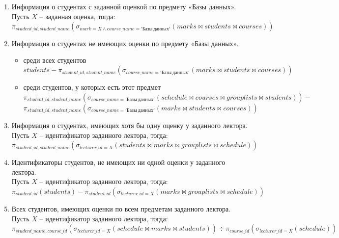 \documentclass[10pt, a4paper]{article}
\begin{document}
\begin{enumerate}

	\item {Информация о студентах с заданной оценкой по предмету «Базы данных».\\
	Пусть $X$ -- заданная оценка, тогда:\\
	$\pi_{student\_id, student\_name}(\sigma_{mark = X \wedge course\_name = 'Базы \: данных'}(marks \bowtie students \bowtie courses))$
	}


	\item {Информация о студентах не имеющих оценки по предмету «Базы данных».
		\begin{itemize}

			\item {среди всех студентов\\
			$students - \pi_{student\_id, student\_name}(\sigma_{course\_name = 'Базы \: данных'}(marks \bowtie students \bowtie courses))$
			}

			\item {среди студентов, у которых есть этот предмет\\
			$\pi_{student\_id, student\_name}(\sigma_{course\_name = 'Базы \: данных'}(schedule \bowtie courses \bowtie grouplists \bowtie students)) -$\\
			$\pi_{student\_id, student\_name}(\sigma_{course\_name = 'Базы \: данных'}(marks \bowtie students \bowtie courses))$
			}

		\end{itemize}
	}

	\item {Информация о студентах, имеющих хотя бы одну оценку у заданного лектора.\\
	Пусть $X$ -- идентификатор заданного лектора, тогда:\\
	$\pi_{student\_id, student\_name}(\sigma_{lecturer\_id = X}(students \bowtie marks \bowtie grouplists \bowtie schedule))$
	}

	\item {Идентификаторы студентов, не имеющих ни одной оценки у заданного лектора.\\
	Пусть $X$ -- идентификатор заданного лектора, тогда:\\
	$\pi_{student\_id}(students) - \pi_{student\_id}(\sigma_{lecturer\_id = X}(marks \bowtie grouplists \bowtie schedule))$
	}

	\item {Всех студентов, имеющих оценки по всем предметам заданного лектора.\\
	Пусть $X$ -- идентификатор заданного лектора, тогда:\\
	$\pi_{student\_name, course\_id}(\sigma_{lecturer\_id = X}(schedule \bowtie marks \bowtie students)) \div \pi_{course\_id}(\sigma_{lecturer\_id = X}(schedule))$
	}


\end{enumerate}
\end{document}
